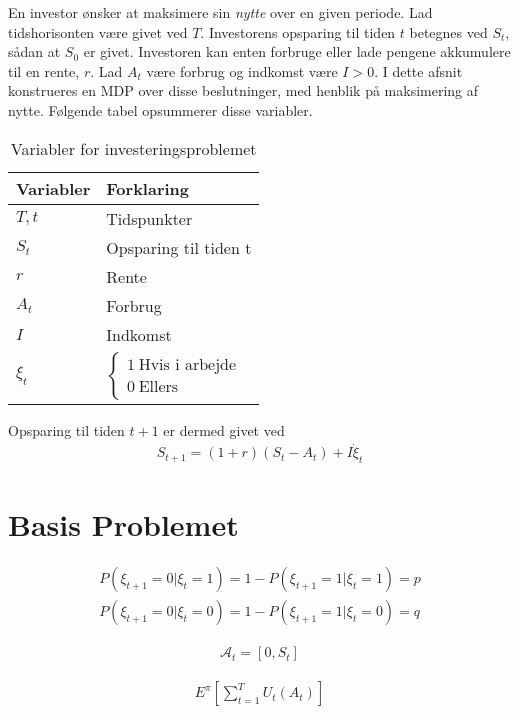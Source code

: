 En investor ønsker at maksimere sin \textit{nytte} over en given periode.
Lad tidshorisonten være givet ved $T$. Investorens opsparing til tiden $t$ betegnes ved $S_t$, sådan at $S_0$ er givet. Investoren kan enten forbruge eller lade pengene akkumulere til en rente, $r$. Lad $A_t$ være forbrug og indkomst være $I>0$. I dette afsnit konstrueres en MDP over disse beslutninger, med henblik på maksimering af nytte. Følgende tabel opsummerer disse variabler.


\begin{table}[!hbt]
\caption{Variabler for investeringsproblemet}
\begin{tabular}{@{}l|l@{}}
\toprule
Variabler & Forklaring                     \\ \midrule
$T,t$       & Tidspunkter                  \\
$S_t$       & Opsparing til tiden t        \\
$r$         & Rente                        \\
$A_t$       & Forbrug                      \\
$I$         & Indkomst                     \\
$\xi_t$     & $\begin{cases}1\ \text{Hvis i arbejde}\\0\ \text{Ellers}\end{cases}$ \\ \bottomrule
\end{tabular}
\end{table}




Opsparing til tiden $t+1$ er dermed givet ved
\begin{align*}
    S_{t+1}=(1+r)(S_t-A_t)+I\dot \xi_t
\end{align*}


\section{Basis Problemet}


\begin{align*}
    P(\xi_{t+1}=0|\xi_t=1)=1-P(\xi_{t+1}=1|\xi_t=1)=p\\
    P(\xi_{t+1}=0|\xi_t=0)=1-P(\xi_{t+1}=1|\xi_t=0)=q
\end{align*}

\begin{align*}
    \mathcal{A}_t=[0,S_t]
\end{align*}

\begin{align*}
    E^\pi[\sum_{t=1}^T U_t(A_t)]
\end{align*}



